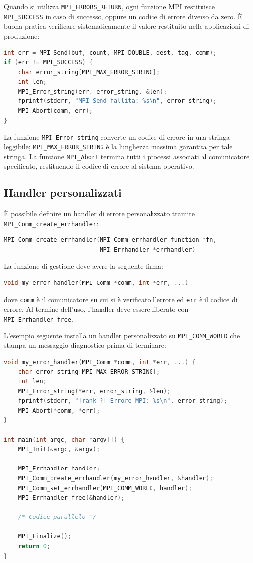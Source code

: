 Quando si utilizza \texttt{MPI\_ERRORS\_RETURN}, ogni funzione MPI restituisce \texttt{MPI\_SUCCESS} in caso di successo, oppure un codice di errore diverso da zero. È buona pratica verificare sistematicamente il valore restituito nelle applicazioni di produzione:
\begin{lstlisting}[language=C, numbers=none]
int err = MPI_Send(buf, count, MPI_DOUBLE, dest, tag, comm);
if (err != MPI_SUCCESS) {
    char error_string[MPI_MAX_ERROR_STRING];
    int len;
    MPI_Error_string(err, error_string, &len);
    fprintf(stderr, "MPI_Send fallita: %s\n", error_string);
    MPI_Abort(comm, err);
}
\end{lstlisting}
La funzione \texttt{MPI\_Error\_string} converte un codice di errore in una stringa leggibile; \texttt{MPI\_MAX\_ERROR\_STRING} è la lunghezza massima garantita per tale stringa. La funzione \texttt{MPI\_Abort} termina tutti i processi associati al comunicatore specificato, restituendo il codice di errore al sistema operativo.

\subsection{Handler personalizzati}
È possibile definire un handler di errore personalizzato tramite \texttt{MPI\_Comm\_create\_errhandler}:
\begin{lstlisting}[language=C, numbers=none]
MPI_Comm_create_errhandler(MPI_Comm_errhandler_function *fn,
                           MPI_Errhandler *errhandler)
\end{lstlisting}
La funzione di gestione deve avere la seguente firma:
\begin{lstlisting}[language=C, numbers=none]
void my_error_handler(MPI_Comm *comm, int *err, ...)
\end{lstlisting}
dove \texttt{comm} è il comunicatore su cui si è verificato l'errore ed \texttt{err} è il codice di errore. Al termine dell'uso, l'handler deve essere liberato con \texttt{MPI\_Errhandler\_free}.

L'esempio seguente installa un handler personalizzato su \texttt{MPI\_COMM\_WORLD} che stampa un messaggio diagnostico prima di terminare:
\begin{lstlisting}[language=C, numbers=none]
void my_error_handler(MPI_Comm *comm, int *err, ...) {
    char error_string[MPI_MAX_ERROR_STRING];
    int len;
    MPI_Error_string(*err, error_string, &len);
    fprintf(stderr, "[rank ?] Errore MPI: %s\n", error_string);
    MPI_Abort(*comm, *err);
}

int main(int argc, char *argv[]) {
    MPI_Init(&argc, &argv);

    MPI_Errhandler handler;
    MPI_Comm_create_errhandler(my_error_handler, &handler);
    MPI_Comm_set_errhandler(MPI_COMM_WORLD, handler);
    MPI_Errhandler_free(&handler);

    /* Codice parallelo */

    MPI_Finalize();
    return 0;
}
\end{lstlisting}

